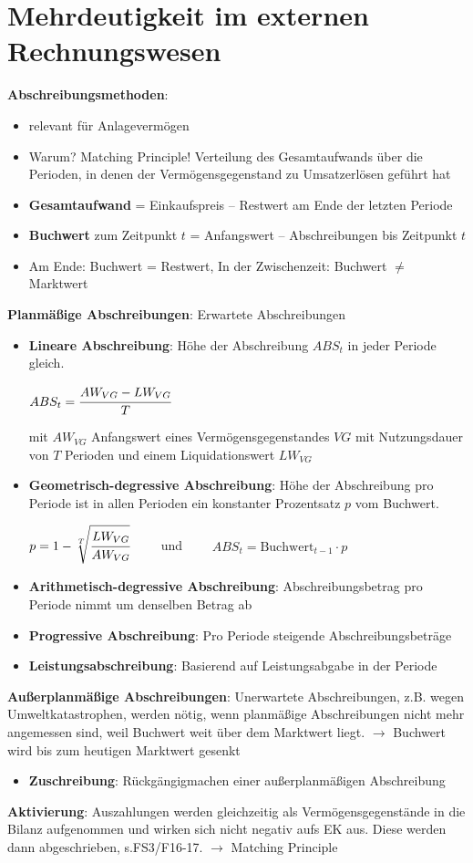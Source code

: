 \section{Mehrdeutigkeit im externen Rechnungswesen}

\textbf{Abschreibungsmethoden}: 
\begin{itemize}
	\item relevant für Anlagevermögen
	\item Warum? Matching Principle! Verteilung des Gesamtaufwands über die Perioden, in denen der Vermögensgegenstand zu Umsatzerlösen geführt hat
	\item \textbf{Gesamtaufwand} = Einkaufspreis $–$ Restwert am Ende der letzten Periode
	\item \textbf{Buchwert} zum Zeitpunkt $t$ = Anfangswert $–$ Abschreibungen bis Zeitpunkt $t$
	\item Am Ende: Buchwert = Restwert, In der Zwischenzeit: Buchwert $\neq$ Marktwert
\end{itemize}
\bigskip
\textbf{Planmäßige Abschreibungen}: Erwartete Abschreibungen
\begin{itemize}
	\item \textbf{Lineare Abschreibung}: Höhe der Abschreibung $ABS_t$ in jeder Periode gleich.
	\begin{tightcenter}
		$ABS_t=\cfrac{AW_{VG}-LW_{VG}}{T}$
	\end{tightcenter}
	mit $AW_{VG}$ Anfangswert eines Vermögensgegenstandes $VG$ mit Nutzungsdauer von $T$ Perioden und einem Liquidationswert $LW_{VG}$
	\item \textbf{Geometrisch-degressive Abschreibung}: Höhe der Abschreibung pro Periode ist in allen
	Perioden ein konstanter Prozentsatz $p$ vom Buchwert.
	\begin{tightcenter}
		$p=1-\sqrt[T]{\cfrac{LW_{VG}}{AW_{VG}}}\qquad$ und $\qquad ABS_t=\text{Buchwert}_{t-1}\cdot p$
	\end{tightcenter}
	\item \textbf{Arithmetisch-degressive Abschreibung}: Abschreibungsbetrag pro Periode nimmt um denselben Betrag ab
	\item \textbf{Progressive Abschreibung}: Pro Periode steigende Abschreibungsbeträge
	\item \textbf{Leistungsabschreibung}: Basierend auf Leistungsabgabe in der Periode
\end{itemize}
\bigskip
\textbf{Außerplanmäßige Abschreibungen}: Unerwartete Abschreibungen, z.B. wegen Umweltkatastrophen, werden nötig, wenn planmäßige Abschreibungen nicht mehr angemessen sind, weil Buchwert weit über dem
Marktwert liegt. $\rightarrow$ Buchwert wird bis zum heutigen Marktwert gesenkt
\begin{itemize}
	\item \textbf{Zuschreibung}: Rückgängigmachen einer außerplanmäßigen Abschreibung
\end{itemize}
\bigskip
\textbf{Aktivierung}: Auszahlungen werden gleichzeitig als Vermögensgegenstände in die Bilanz aufgenommen und wirken sich nicht negativ aufs EK aus. 
Diese werden dann abgeschrieben, s.FS3/F16-17. $\rightarrow$ Matching Principle\\

